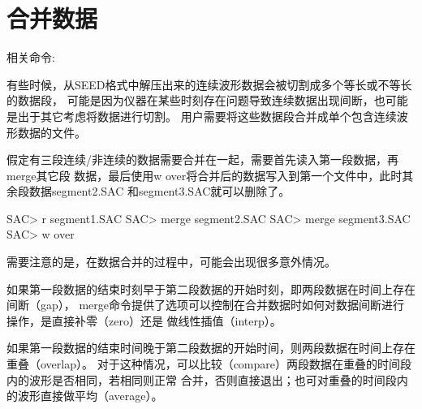 \section{合并数据}
相关命令: 

有些时候，从SEED格式中解压出来的连续波形数据会被切割成多个等长或不等长的数据段，
可能是因为仪器在某些时刻存在问题导致连续数据出现间断，也可能是出于其它考虑将数据进行切割。
用户需要将这些数据段合并成单个包含连续波形数据的文件。

假定有三段连续/非连续的数据需要合并在一起，需要首先读入第一段数据，再merge其它段
数据，最后使用w over将合并后的数据写入到第一个文件中，此时其余段数据segment2.SAC
和segment3.SAC就可以删除了。

\begin{SACCode}
SAC> r segment1.SAC
SAC> merge segment2.SAC
SAC> merge segment3.SAC
SAC> w over
\end{SACCode}

需要注意的是，在数据合并的过程中，可能会出现很多意外情况。

如果第一段数据的结束时刻早于第二段数据的开始时刻，即两段数据在时间上存在间断（gap），
merge命令提供了选项可以控制在合并数据时如何对数据间断进行操作，是直接补零（zero）还是
做线性插值（interp）。

如果第一段数据的结束时间晚于第二段数据的开始时间，则两段数据在时间上存在重叠（overlap）。
对于这种情况，可以比较（compare）两段数据在重叠的时间段内的波形是否相同，若相同则正常
合并，否则直接退出；也可对重叠的时间段内的波形直接做平均（average）。
